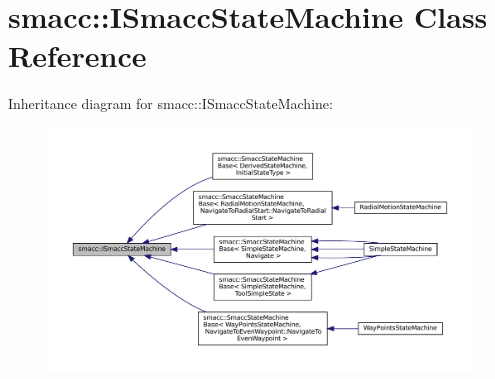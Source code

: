 \hypertarget{classsmacc_1_1ISmaccStateMachine}{}\section{smacc\+:\+:I\+Smacc\+State\+Machine Class Reference}
\label{classsmacc_1_1ISmaccStateMachine}


Inheritance diagram for smacc\+:\+:I\+Smacc\+State\+Machine\+:
\nopagebreak
\begin{figure}[H]
\begin{center}
\leavevmode
\includegraphics[width=350pt]{classsmacc_1_1ISmaccStateMachine__inherit__graph}
\end{center}
\end{figure}
